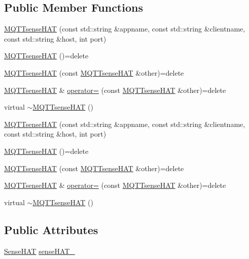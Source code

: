 \subsection*{Public Member Functions}
\begin{DoxyCompactItemize}
\item 
\hyperlink{class_m_q_t_tsense_h_a_t_aebf1fa63fff01df39062b9f8e204c094}{M\+Q\+T\+Tsense\+H\+AT} (const std\+::string \&appname, const std\+::string \&clientname, const std\+::string \&host, int port)
\item 
\hyperlink{class_m_q_t_tsense_h_a_t_a93e7e34b58de720b6408d7fe1c105f30}{M\+Q\+T\+Tsense\+H\+AT} ()=delete
\item 
\hyperlink{class_m_q_t_tsense_h_a_t_a6dfcdbe30dac95e0348dfdfa4b79b1d1}{M\+Q\+T\+Tsense\+H\+AT} (const \hyperlink{class_m_q_t_tsense_h_a_t}{M\+Q\+T\+Tsense\+H\+AT} \&other)=delete
\item 
\hyperlink{class_m_q_t_tsense_h_a_t}{M\+Q\+T\+Tsense\+H\+AT} \& \hyperlink{class_m_q_t_tsense_h_a_t_a14b36ab0892f31e920b0df90194c8810}{operator=} (const \hyperlink{class_m_q_t_tsense_h_a_t}{M\+Q\+T\+Tsense\+H\+AT} \&other)=delete
\item 
virtual \hyperlink{class_m_q_t_tsense_h_a_t_afa0dbb02ab0471f273fcca1afecc173c}{$\sim$\+M\+Q\+T\+Tsense\+H\+AT} ()
\item 
\hyperlink{class_m_q_t_tsense_h_a_t_aebf1fa63fff01df39062b9f8e204c094}{M\+Q\+T\+Tsense\+H\+AT} (const std\+::string \&appname, const std\+::string \&clientname, const std\+::string \&host, int port)
\item 
\hyperlink{class_m_q_t_tsense_h_a_t_a93e7e34b58de720b6408d7fe1c105f30}{M\+Q\+T\+Tsense\+H\+AT} ()=delete
\item 
\hyperlink{class_m_q_t_tsense_h_a_t_a6dfcdbe30dac95e0348dfdfa4b79b1d1}{M\+Q\+T\+Tsense\+H\+AT} (const \hyperlink{class_m_q_t_tsense_h_a_t}{M\+Q\+T\+Tsense\+H\+AT} \&other)=delete
\item 
\hyperlink{class_m_q_t_tsense_h_a_t}{M\+Q\+T\+Tsense\+H\+AT} \& \hyperlink{class_m_q_t_tsense_h_a_t_a14b36ab0892f31e920b0df90194c8810}{operator=} (const \hyperlink{class_m_q_t_tsense_h_a_t}{M\+Q\+T\+Tsense\+H\+AT} \&other)=delete
\item 
virtual \hyperlink{class_m_q_t_tsense_h_a_t_a78c180f348470a9d698c28854d75a49a}{$\sim$\+M\+Q\+T\+Tsense\+H\+AT} ()
\end{DoxyCompactItemize}
\subsection*{Public Attributes}
\begin{DoxyCompactItemize}
\item 
\hyperlink{class_sense_h_a_t}{Sense\+H\+AT} \hyperlink{class_m_q_t_tsense_h_a_t_a50dfd49dde7594da4193b8b90f6c1048}{sense\+H\+A\+T\+\_\+}
\end{DoxyCompactItemize}

